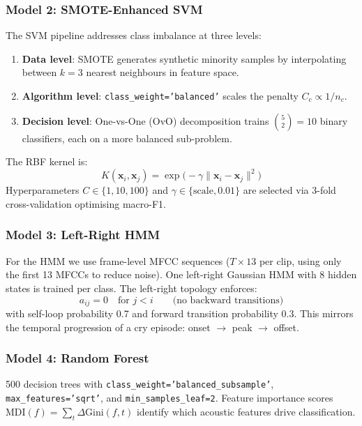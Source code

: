 \documentclass[11pt,a4paper]{article}
\begin{document}
\subsubsection{Model 2: SMOTE-Enhanced SVM}

The SVM pipeline addresses class imbalance at three levels:
\begin{enumerate}[nosep]
  \item \textbf{Data level}: SMOTE generates synthetic minority samples
        by interpolating between $k = 3$ nearest neighbours in feature space.
  \item \textbf{Algorithm level}: \texttt{class\_weight='balanced'}
        scales the penalty $C_c \propto 1 / n_c$.
  \item \textbf{Decision level}: One-vs-One (OvO) decomposition trains
        $\binom{5}{2} = 10$ binary classifiers, each on a more
        balanced sub-problem.
\end{enumerate}
The RBF kernel is:
\begin{equation}
  K(\mathbf{x}_i, \mathbf{x}_j) =
    \exp\!\bigl(-\gamma \|\mathbf{x}_i - \mathbf{x}_j\|^2\bigr)
\end{equation}
Hyperparameters $C \in \{1, 10, 100\}$ and
$\gamma \in \{\text{scale}, 0.01\}$ are selected via 3-fold
cross-validation optimising macro-F1.

\subsubsection{Model 3: Left-Right HMM}

For the HMM we use frame-level MFCC sequences
($T \times 13$ per clip, using only the first 13 MFCCs to reduce
noise). One left-right Gaussian HMM with 8 hidden states is trained
per class. The left-right topology enforces:
\begin{equation}
  a_{ij} = 0 \quad \text{for } j < i
  \qquad\text{(no backward transitions)}
\end{equation}
with self-loop probability 0.7 and forward transition probability 0.3.
This mirrors the temporal progression of a cry episode: onset
$\rightarrow$ peak $\rightarrow$ offset.

\subsubsection{Model 4: Random Forest}

500 decision trees with \texttt{class\_weight='balanced\_subsample'},
\texttt{max\_features='sqrt'}, and \texttt{min\_samples\_leaf=2}.
Feature importance scores $\text{MDI}(f) = \sum_t \Delta \text{Gini}(f, t)$
identify which acoustic features drive classification.
\end{document}
